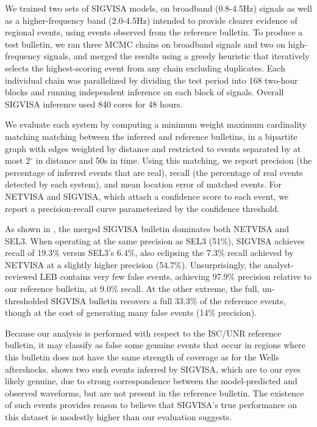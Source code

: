 \documentclass[twoside]{article} \usepackage{aistats2017}
\renewcommand{\deg}{\ensuremath{^\circ}}
\begin{document}
We trained two sets of SIGVISA models, on
broadband (0.8-4.5Hz) signals as well as a higher-frequency band
(2.0-4.5Hz) intended to provide clearer evidence of regional
events, using events observed from the reference bulletin. 
To produce a test bulletin, we ran three MCMC chains on
broadband signals and two on high-frequency signals, and merged the
results using a greedy heuristic that iteratively selects the
highest-scoring event from any chain excluding duplicates. Each
individual chain was parallelized by dividing the test period into 168
two-hour blocks and running independent inference on each block of
signals. Overall SIGVISA inference used 840 cores for 48 hours.

We evaluate each system by computing a minimum weight maximum
cardinality matching matching between the inferred and reference bulletins, in a bipartite
graph with edges weighted by distance and restricted to
events separated by at most $2\deg$ in distance and 50s in
time. Using this matching, we report precision (the percentage of inferred
events that are real), recall (the percentage of real events detected
by each system), and mean location error of matched events. For
NETVISA and SIGVISA, which attach a confidence score to each event, we
report a precision-recall curve parameterized by the confidence
threshold. 

As shown in , the merged SIGVISA
bulletin dominates both NETVISA and SEL3. When operating at the same
precision as SEL3 (51\%), SIGVISA achieves recall of 19.3\% versus
SEL3's 6.4\%, also eclipsing the 7.3\% recall achieved by NETVISA at a slightly higher
precision (54.7\%). Unsurprisingly, the analyst-reviewed LEB contains very few
false events, achieving 97.9\% precision relative to our reference
bulletin, at 9.0\% recall. At the other extreme, the full,
un-thresholded SIGVISA bulletin recovers a full 33.3\% of the reference
events, though at the cost of generating many false events (14\% precision). 

Because our analysis is performed with respect to the ISC/UNR
reference bulletin, it may classify as false some genuine events that
occur in regions where this bulletin does not have the same strength
of coverage as for the Wells
aftershocks.  shows two such
events inferred by SIGVISA, which are to our eyes likely genuine, due to
strong correspondence between the model-predicted and observed
waveforms, but are not
present in the reference bulletin. The existence of such events provides reason to believe
that SIGVISA's true performance on this dataset is modestly higher than our evaluation
suggests. 
\end{document}
